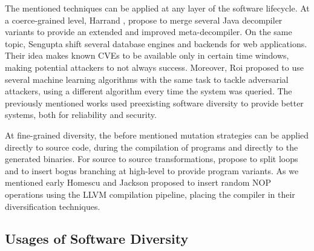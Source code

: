 The mentioned techniques can be applied at any layer of the software lifecycle. At a coerce-grained level, Harrand \etal, propose to merge several Java decompiler variants to provide an extended and improved meta-decompiler. On the same topic, Sengupta \etal \cite{10.5555/3091125.3091155} shift several database engines and backends for web applications. Their idea makes known CVEs to be available only in certain time windows, making potential attackers to not always success. Moreover, Roi \etal \cite{10.1145/3318216.3363338} proposed to use several machine learning algorithms with the same task to tackle adversarial attackers, using a different algorithm every time the system was queried.
The previously mentioned works used preexisting software diversity to provide better systems, both for reliability and security.


At fine-grained diversity, the before mentioned mutation strategies can be applied directly to source code, during the compilation of programs and directly to the generated binaries. For source to source transformations,  \etal {} propose to split loops and to insert bogus branching at high-level to provide program variants. As we mentioned early Homescu \etal \cite{homescu2013profile} and Jackson \etal {} proposed to insert random NOP operations using the LLVM compilation pipeline, placing the compiler in their diversification techniques.  


\subsection*{Usages of Software Diversity}

